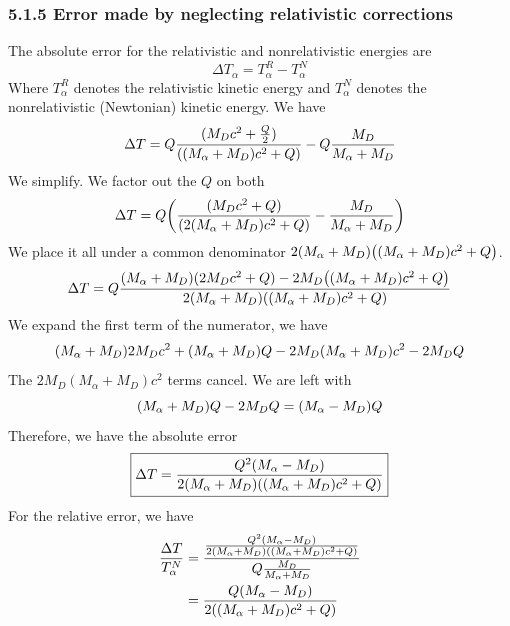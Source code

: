 \documentclass[12pt,a4paper]{article}
\begin{document}
\begin{solution_pset}
		\subsubsection*{5.1.5 Error made by neglecting relativistic corrections}
			\nocite{flores2026}
			The absolute error for the relativistic and nonrelativistic energies are
			\[
				\Delta T_\alpha = T_\alpha^R - T_\alpha^N
			\]
			Where $T_\alpha^R$ denotes the relativistic kinetic energy and $T_\alpha^N$
			denotes the nonrelativistic (Newtonian) kinetic energy. We have
			\[
				\Delta T = 
				Q
				\frac{
					(M_D c^2+\frac{Q}{2})
				}{
					\pqty{
						(M_\alpha + M_D)c^2 +Q
					} 
				} 
				-
				Q
				\frac{
					M_D
				}{
					M_\alpha + M_D
				} 
			\]
			We simplify. We factor out the $Q$ on both
			\[
				\Delta T =
				Q
				\pqty{
					\frac{
						(M_D c^2+Q)
					}{
						\pqty{
							2(M_\alpha + M_D)c^2 +Q
						} 
					} 
					-
					\frac{
						M_D
					}{
						M_\alpha + M_D
					} 
				}
			\]
			We place it all under a common denominator 
			$2(M_\alpha + M_D)\pqty{(M_\alpha + M_D) c^2 +Q}$.
			\[
				\Delta T =
				Q
				\frac{
					(M_\alpha + M_D)(2M_D c^2 +Q) - 2M_D
					\pqty{
						(M_\alpha + M_D) 
						c^2
						+
						Q
					}
				}{
					2(M_\alpha + M_D)
					\pqty{
						(M_\alpha + M_D) c^2 +Q
					}
				} 
			\]
			We expand the first term of the numerator, we have
			\[
				\pqty{
					M_\alpha 
					+
					M_D
				}
				2 M_D c^2
				+
				\pqty{
					M_\alpha 
					+
					M_D
				}
				Q
				-
				2M_D
				\pqty{
					M_\alpha 
					+
					M_D
				}
				c^2
				-
				2M_D Q
			\]
			The $2 M_D(M_\alpha + M_D)c^2$ terms cancel. We are left with
			\[
				\pqty{
					M_\alpha 
					+
					M_D
				}
				Q
				-
				2M_D Q
				=
				\pqty{
					M_\alpha 
					-
					M_D
				}
				Q
			\]
			Therefore, we have the absolute error
			\[
				\boxed{
					\Delta T 
					=
					\frac{
						Q^2
						\pqty{
							M_\alpha 
							-
							M_D
						}
					}{
						2(M_\alpha + M_D)\pqty{(M_\alpha + M_D) c^2 +Q}
					} 
				}
			\]
			For the relative error, we have
			\begin{align*}
				\frac{\Delta T}{T_\alpha^N} 
				&=
				\frac{
					\frac{
						Q^2
						\pqty{
							M_\alpha 
							-
							M_D
						}
					}{
						2(M_\alpha + M_D)\pqty{(M_\alpha + M_D) c^2 +Q}
					} 
				}{
					Q
					\frac{
						M_D
					}{
						M_\alpha + M_D
					} 
				} 
				\\
				&=
				\frac{
					Q 
					\pqty{
						M_\alpha 
						-
						M_D
					}
				}{
					2\pqty{(M_\alpha + M_D) c^2 +Q}
}
\end{align*}
\end{solution_pset}
\end{document}
